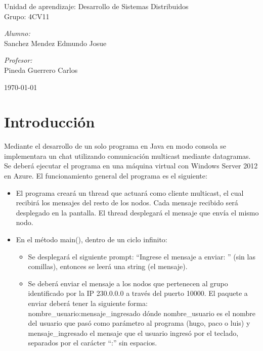 \documentclass[11pt]{article}
\begin{document}
\begin{titlepage}
\begin{center}
				{ \Large Unidad de aprendizaje: Desarrollo de Sistemas Distribuidos} \\[1cm]
				
				{ \Large Grupo: 4CV11 } \\[1cm]
				
				\noindent
				\begin{minipage}{0.5\textwidth}
					\begin{flushleft} \large
						\emph{Alumno:} \\
						Sanchez Mendez Edmundo Josue
					\end{flushleft}
				\end{minipage}%
				\begin{minipage}{0.5\textwidth}
					\begin{flushright} \large
						\emph{Profesor:} \\
						Pineda Guerrero Carlos 
					\end{flushright}
				\end{minipage}
				
				\vfill
				{\large {\today}}
			\end{center}
		\end{titlepage}
	
	\titlepage
	\tableofcontents
	\newpage
	
	\section{Introducción}
		Mediante el desarrollo de un solo programa en Java en modo consola se implementara un chat utilizando comunicación multicast mediante datagramas. Se deberá ejecutar el programa en una máquina virtual con Windows Server 2012 en Azure. El funcionamiento general del programa es el siguiente:
		\begin{itemize}
			\item El programa creará un thread que actuará como cliente multicast, el cual recibirá los mensajes del resto de los nodos. Cada mensaje recibido será desplegado en la pantalla. El thread desplegará el mensaje que envía el mismo nodo.
			\item En el método main(), dentro de un ciclo infinito:
			\begin{itemize}
				\item Se desplegará el siguiente prompt: ``Ingrese el mensaje a enviar: '' (sin las comillas), entonces se leerá una string (el mensaje).
				\item Se deberá enviar el mensaje a los nodos que pertenecen al grupo identificado por la IP 230.0.0.0 a través del puerto 10000. El paquete a enviar deberá tener la siguiente forma: nombre\_usuario:mensaje\_ingresado dónde nombre\_usuario es el nombre del usuario que pasó como parámetro al programa (hugo, paco o luis) y mensaje\_ingresado el mensaje que el usuario ingresó por el teclado, separados por el carácter ``:'' sin espacios.
			\end{itemize}
		\end{itemize}
\end{document}
